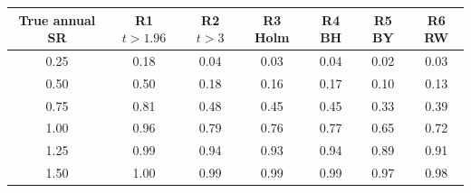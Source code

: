 \begin{tabular}{c cccccc}
\toprule
True annual SR & R1 $t{>}1.96$ & R2 $t{>}3$ & R3 Holm & R4 BH & R5 BY & R6 RW \\
\midrule
0.25 & 0.18 & 0.04 & 0.03 & 0.04 & 0.02 & 0.03 \\
0.50 & 0.50 & 0.18 & 0.16 & 0.17 & 0.10 & 0.13 \\
0.75 & 0.81 & 0.48 & 0.45 & 0.45 & 0.33 & 0.39 \\
1.00 & 0.96 & 0.79 & 0.76 & 0.77 & 0.65 & 0.72 \\
1.25 & 0.99 & 0.94 & 0.93 & 0.94 & 0.89 & 0.91 \\
1.50 & 1.00 & 0.99 & 0.99 & 0.99 & 0.97 & 0.98 \\
\bottomrule
\end{tabular}